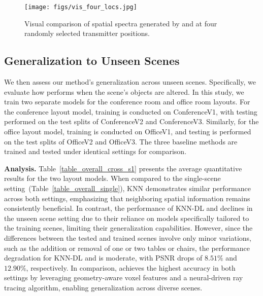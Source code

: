 \begin{figure}[t]
\centering
{\texttt{[image: figs/vis\_four\_locs.jpg]}}
	\vspace{-0.1in}
\caption{Visual comparison of spatial spectra generated by \nerft and \ourSystem at four randomly selected transmitter positions.}
	\label{fig_vis_d1}
\end{figure}


\subsection{Generalization to Unseen Scenes }\label{sec_eval_cross}
We then assess our method's generalization across unseen scenes. Specifically, we evaluate how \ourSystem performs when the scene's objects are altered. 
In this study, we train two separate models for the conference room and office room layouts. 
For the conference layout model, training is conducted on ConferenceV1, with testing performed on the test splits of ConferenceV2 and ConferenceV3. 
Similarly, for the office layout model, training is conducted on OfficeV1, and testing is performed on the test splits of OfficeV2 and OfficeV3. 
The three baseline methods are trained and tested under identical settings for comparison.



\textbf{Analysis.}
Table~\ref{table_overall_cross_s1} presents the average quantitative results for the two layout models.
When compared to the single-scene setting~(Table~\ref{table_overall_single}), KNN demonstrates similar performance across both settings, emphasizing that neighboring spatial information remains consistently beneficial. 
In contrast, the performance of KNN-DL and \nerft declines in the unseen scene setting due to their reliance on models specifically tailored to the training scenes, limiting their generalization capabilities. 
However, since the differences between the tested and trained scenes involve only minor variations, such as the addition or removal of one or two tables or chairs, the performance degradation for KNN-DL and \nerft is moderate, with PSNR drops of \(8.51\%\) and \(12.90\%\), respectively.
In comparison, \ourSystem achieves the highest accuracy in both settings by leveraging geometry-aware voxel features and a neural-driven ray tracing algorithm, enabling generalization across diverse scenes.



